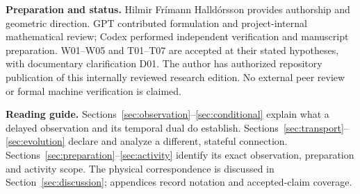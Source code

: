 \documentclass[11pt,a4paper]{article}
\theoremstyle{definition}\newtheorem{theorem}{Theorem}[section]
\theoremstyle{definition}\newtheorem{definition}[theorem]{Definition}
\theoremstyle{remark}\newtheorem{remark}[theorem]{Remark}
\begin{document}
\begin{titlepage}
\begin{minipage}{0.94\textwidth}
\end{minipage}
\vfill
\begin{minipage}{0.94\textwidth}\small
\textbf{Preparation and status.} Hilmir Frímann Halldórsson provides authorship and geometric direction. GPT contributed formulation and project-internal mathematical review; Codex performed independent verification and manuscript preparation. W01--W05 and T01--T07 are accepted at their stated hypotheses, with documentary clarification D01. The author has authorized repository publication of this internally reviewed research edition. No external peer review or formal machine verification is claimed.
\end{minipage}
\end{titlepage}
\hypersetup{pageanchor=true}\setcounter{page}{2}
\setcounter{tocdepth}{1}\tableofcontents
\vspace{7mm}
\textbf{Reading guide.} Sections~\ref{sec:observation}--\ref{sec:conditional} explain what a delayed observation and its temporal dual do establish. Sections~\ref{sec:transport}--\ref{sec:evolution} declare and analyze a different, stateful connection. Sections~\ref{sec:preparation}--\ref{sec:activity} identify its exact observation, preparation and activity scope. The physical correspondence is discussed in Section~\ref{sec:discussion}; appendices record notation and accepted-claim coverage.
\clearpage









\appendix


\end{document}
